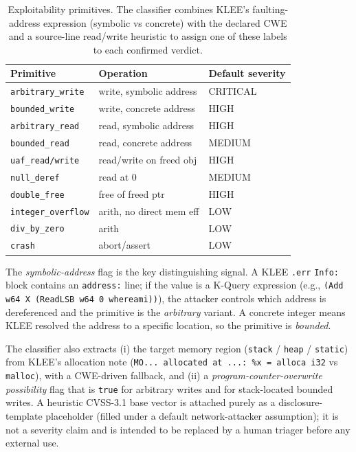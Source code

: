 \documentclass[3p,times,procedia]{elsarticle}
\begin{document}
\begin{table}[t]
\caption{Exploitability primitives. The classifier combines KLEE's faulting-address expression (symbolic vs concrete) with the declared CWE and a source-line read/write heuristic to assign one of these labels to each confirmed verdict.}
\label{tab:prim}
\begin{tabular*}{\hsize}{@{\extracolsep{\fill}}lll@{}}
\toprule
\textbf{Primitive} & \textbf{Operation} & \textbf{Default severity} \\
\midrule
\texttt{arbitrary\_write}  & write, symbolic address  & CRITICAL \\
\texttt{bounded\_write}    & write, concrete address  & HIGH     \\
\texttt{arbitrary\_read}   & read, symbolic address   & HIGH     \\
\texttt{bounded\_read}     & read, concrete address   & MEDIUM   \\
\texttt{uaf\_read/write}   & read/write on freed obj  & HIGH     \\
\texttt{null\_deref}       & read at 0                & MEDIUM   \\
\texttt{double\_free}      & free of freed ptr        & HIGH     \\
\texttt{integer\_overflow} & arith, no direct mem eff & LOW      \\
\texttt{div\_by\_zero}     & arith                    & LOW      \\
\texttt{crash}             & abort/assert             & LOW      \\
\bottomrule
\end{tabular*}
\end{table}

The \emph{symbolic-address} flag is the key distinguishing signal. A KLEE \texttt{.err} \texttt{Info:} block contains an \texttt{address:} line; if the value is a K-Query expression (e.g., \texttt{(Add w64 X (ReadLSB w64 0 whereami))}), the attacker controls which address is dereferenced and the primitive is the \emph{arbitrary} variant. A concrete integer means KLEE resolved the address to a specific location, so the primitive is \emph{bounded}.

The classifier also extracts (i) the target memory region (\texttt{stack} / \texttt{heap} / \texttt{static}) from KLEE's allocation note (\texttt{MO... allocated at ...: \%x = alloca i32} vs \texttt{malloc}), with a CWE-driven fallback, and (ii) a \emph{program-counter-overwrite possibility} flag that is \texttt{true} for arbitrary writes and for stack-located bounded writes. A heuristic CVSS-3.1 base vector is attached purely as a disclosure-template placeholder (filled under a default network-attacker assumption); it is not a severity claim and is intended to be replaced by a human triager before any external use.
\end{document}
